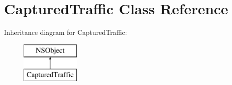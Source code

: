 \hypertarget{interface_captured_traffic}{}\section{Captured\+Traffic Class Reference}
\label{interface_captured_traffic}
Inheritance diagram for Captured\+Traffic\+:\begin{figure}[H]
\begin{center}
\leavevmode
\includegraphics[height=2.000000cm]{interface_captured_traffic}
\end{center}
\end{figure}
